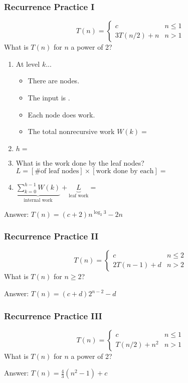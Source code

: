 \documentclass{beamer}
\newcommand{\blank}{\underbar{\hphantom{aaaaaaaa}}}
\begin{document}
\begin{frame}[t]
  \frametitle{Recurrence Practice I}
  \begin{equation*}
    T(n) = \begin{cases}
    c & n \leq 1 \\
    3T(n/2) + n & n > 1
    \end{cases}
  \end{equation*}
  What is $T(n)$ for $n$ a power of 2?
  \pause
  \begin{enumerate}
    \item At level $k$...
    \begin{itemize}
      \item There are \blank nodes.
      \item The input is \blank.
      \item Each node does \blank work.
      \item The total nonrecursive work $W(k)=$ \blank
    \end{itemize}
    \item $h =$ \blank
    \item What is the work done by the leaf nodes? $L = [\text{\# of leaf nodes}] \times [\text{work done by each}] = $ \blank
    \item $\underbrace{\sum\limits_{k = 0}^{h - 1} W(k)}_{\text{internal work}} + \underbrace{L}_{\text{leaf work}} = $ \blank
  \end{enumerate}

  \pause
  Answer: $T(n) = (c + 2)n^{\log_2 3} - 2n$
\end{frame}

\begin{frame}[t]
  \frametitle{Recurrence Practice II}
  \begin{equation*}
    T(n) = \begin{cases}
    c & n \leq 2 \\
    2T(n - 1) + d & n > 2
    \end{cases}
  \end{equation*}
  What is $T(n)$ for $n \geq 2$?

  \pause 

  \vspace{5cm}

  Answer: $T(n) = (c + d)2^{n - 2} - d$
\end{frame}

\begin{frame}[t]
  \frametitle{Recurrence Practice III}
  \begin{equation*}
    T(n) = \begin{cases}
    c & n \leq 1 \\
    T(n/2) + n^2 & n > 1
    \end{cases}
  \end{equation*}
  What is $T(n)$ for $n$ a power of 2?
  \pause
  \vspace{5cm}


  Answer: $T(n) = \frac43(n^2 - 1) + c$
\end{frame}
\end{document}
